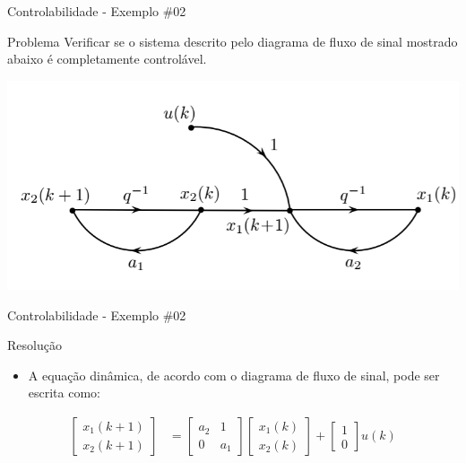 \begin{frame}{Controlabilidade - Exemplo \#02}
\begin{block}{Problema}
Verificar se o sistema descrito pelo diagrama de fluxo de sinal mostrado abaixo é completamente controlável.
\end{block}
\centerline{\includegraphics[width=0.85\linewidth]{Figuras/Ch15/fig2.PNG}}
\end{frame}

\begin{frame}{Controlabilidade - Exemplo \#02}
\begin{block}{Resolução}
\begin{itemize}
    \item A equação dinâmica, de acordo com o diagrama de fluxo de sinal, pode ser escrita como:
\end{itemize}
\begin{align*}
    \begin{bmatrix} x_1(k+1) \\ x_2(k+1) \end{bmatrix}
    &=
    \begin{bmatrix}
    a_2 & 1 \\ 0 & a_1
    \end{bmatrix}
    \begin{bmatrix}
    x_1(k) \\ x_2(k)
    \end{bmatrix}
    +
    \begin{bmatrix}
    1 \\ 0
    \end{bmatrix}
    u(k)
\end{align*}
\end{block}
\end{frame}

